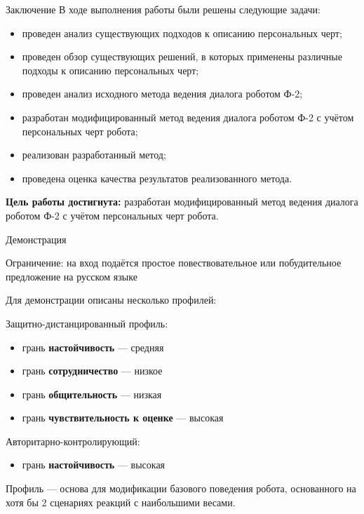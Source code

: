 \documentclass{beamer}
\begin{document}
\begin{frame}{\centering Заключение}
    В ходе выполнения работы были решены следующие задачи:
    \begin{itemize}
        \item[---] проведен анализ существующих подходов к описанию персональных
черт;
        \item[---] проведен обзор существующих решений, в которых применены
различные подходы к описанию персональных черт;
        \item[---] проведен анализ исходного метода ведения диалога роботом Ф-2;
        \item[---] разработан модифицированный метод ведения диалога роботом Ф-2 с
учётом персональных черт робота;
        \item[---] реализован разработанный метод;
        \item[---] проведена оценка качества результатов реализованного метода.
    \end{itemize}
    \vfill
    \textbf{Цель работы достигнута:} разработан модифицированный метод ведения диалога роботом Ф-2 с учётом персональных черт робота.

\end{frame}
    \begin{frame}{\centering Демонстрация}

    Ограничение: на вход подаётся простое повествовательное или побудительное предложение на русском языке

    Для демонстрации описаны несколько профилей:

    Защитно-дистанцированный профиль:

    \begin{itemize}
        \item[---] грань \textbf{настойчивость} --- средняя
        \item[---] грань \textbf{сотрудничество} --- низкое
        \item[---] грань \textbf{общительность} --- низкая
        \item[---] грань \textbf{чувствительность к оценке} --- высокая
    \end{itemize}

    Авторитарно-контролирующий:

    \begin{itemize}
        \item[---] грань \textbf{настойчивость} --- высокая
    \end{itemize}

    Профиль --- основа для модификации базового поведения робота, основанного на хотя бы 2 сценариях реакций с наибольшими весами.
\end{frame}
\end{document}
